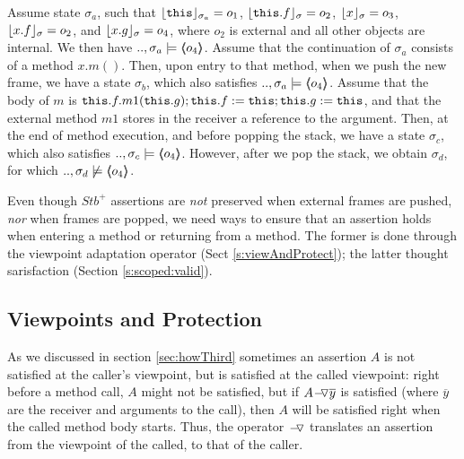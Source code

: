 \begin{example}
\label{ex:motivate:scoped}
Assume state $\sigma_a$, such that $\interpret {\sigma_a} {\prg{this}}=o_1$, $\interpret {\sigma} {\prg{this}.f}=o_2$, $\interpret {\sigma} {x}=o_3$, $\interpret {\sigma} {x.f}=o_2$,  
and $\interpret {\sigma} {x.g}=o_4$, where $o_2$ is external and all other objects are internal. 
We then have $..,\sigma_a \models  \inside {o_4}$.
Assume that the continuation of $\sigma_a$   consists of a method $x.m()$. Then,
upon entry to that method, when we push the new frame, we have a state $\sigma_b$, which also satisfies $..,\sigma_a \models  \inside {o_4}$.
Assume that the   body of $m$ is $\prg{this}.f.m1(\prg{this}.g); \prg{this}.f := \prg{this};  \prg{this}.g := \prg{this}$, and that the external method $m1$ stores in the 
receiver a reference to the argument.
Then, at the end of method execution, and before popping the stack, we have a state $\sigma_c$, which also satisfies $..,\sigma_c \models  \inside {o_4}$.
However, after we pop the stack, we obtain $\sigma_d$, for which $..,\sigma_d \not\models  \inside {o_4}$.
\end{example}


\vspace{.1cm}
Even though  $Stb^+$ assertions    are \emph{not} preserved when  external frames are pushed, \emph{nor} when frames are popped, we need
ways to ensure that an assertion holds when entering a method or returning from a method. 
The former  is done through the viewpoint adaptation operator (Sect \ref{s:viewAndProtect}); the latter thought   
\scoped sarisfaction (Section \ref{s:scoped:valid}).
  
   
 \subsection{Viewpoints and Protection}
 \label{s:preserve:encaps}
 \label{s:viewAndProtect}
 
 As we discussed in section \ref{sec:howThird} sometimes an assertion $A$ is not satisfied at the caller’s
viewpoint, but is satisfied at the called viewpoint:  right before a method call, $A$ might not be satisfied,
but if  $\PushASLong  {\overline y} A$ is satisfied (where $\overline y$ are the receiver and arguments to the call), then $A$
will be satisfied right when the called method body starts. Thus, the operator $\FIXSymbolA$
 translates an assertion from the viewpoint of the called, to that of the caller.
 

